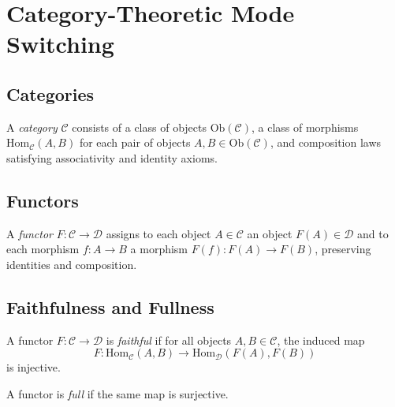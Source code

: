 
\section{Category-Theoretic Mode Switching}

\subsection{Categories}
\begin{definition}
A \emph{category} $\mathcal{C}$ consists of a class of objects
$\mathrm{Ob}(\mathcal{C})$, a class of morphisms
$\mathrm{Hom}_{\mathcal{C}}(A,B)$ for each pair of objects
$A,B \in \mathrm{Ob}(\mathcal{C})$, and composition laws satisfying
associativity and identity axioms.
\end{definition}


\subsection{Functors}
\begin{definition}
A \emph{functor} $F : \mathcal{C} \to \mathcal{D}$ assigns to each object
$A \in \mathcal{C}$ an object $F(A) \in \mathcal{D}$ and to each morphism
$f : A \to B$ a morphism $F(f) : F(A) \to F(B)$, preserving identities and
composition.
\end{definition}


\subsection{Faithfulness and Fullness}
\begin{definition}
A functor $F : \mathcal{C} \to \mathcal{D}$ is \emph{faithful} if for all
objects $A,B \in \mathcal{C}$, the induced map
\[
F : \mathrm{Hom}_{\mathcal{C}}(A,B) \to \mathrm{Hom}_{\mathcal{D}}(F(A),F(B))
\]
is injective.
\end{definition}

\begin{definition}
A functor is \emph{full} if the same map is surjective.
\end{definition}

